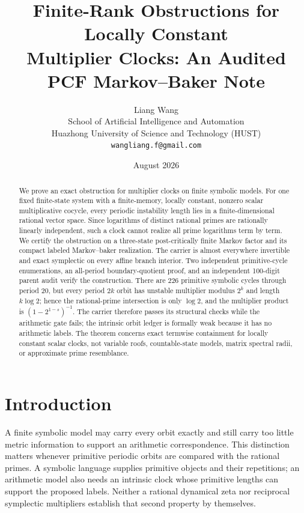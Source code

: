 \documentclass[11pt]{article}
\title{\textbf{Finite-Rank Obstructions for Locally Constant\\
Multiplier Clocks: An Audited PCF Markov--Baker Note}}
\author{
 Liang Wang\\
 School of Artificial Intelligence and Automation\\
 Huazhong University of Science and Technology (HUST)\\
 \texttt{wangliang.f@gmail.com}
}
\date{August 2026}
\theoremstyle{definition}
\theoremstyle{remark}
\begin{document}
\maketitle

\begin{abstract}
We prove an exact obstruction for multiplier clocks on finite symbolic
models.  For one fixed finite-state system with a finite-memory, locally
constant, nonzero scalar multiplicative cocycle, every periodic instability
length lies in a finite-dimensional rational vector space.  Since logarithms
of distinct rational primes are rationally linearly independent, such a clock
cannot realize all prime logarithms term by term.  We certify the obstruction
on a three-state post-critically finite Markov factor and its compact labeled
Markov--baker realization.  The carrier is almost everywhere invertible and
exact symplectic on every affine branch interior.  Two independent
primitive-cycle enumerations, an all-period boundary-quotient proof, and an
independent 100-digit parent audit verify the construction.  There are 226
primitive symbolic cycles through period 20, but every period \(2k\)
orbit has unstable multiplier modulus \(2^k\) and length
\(k\log2\); hence the rational-prime intersection is only \(\log2\), and the
multiplier product is \((1-2^{1-s})^{-1}\).  The carrier therefore passes its
structural checks while the arithmetic gate fails; the intrinsic orbit ledger
is formally weak because it has no arithmetic labels.  The theorem concerns
exact termwise containment for locally constant scalar clocks, not variable
roofs, countable-state models, matrix spectral radii, or approximate prime
resemblance.
\end{abstract}

\section{Introduction}
\label{sec:intro}

A finite symbolic model may carry every orbit exactly and still carry too
little metric information to support an arithmetic correspondence.  This
distinction matters whenever primitive periodic orbits are compared with the
rational primes.  A symbolic language supplies primitive objects and their
repetitions; an arithmetic model also needs an intrinsic clock whose primitive
lengths can support the proposed labels.  Neither a rational dynamical zeta
nor reciprocal symplectic multipliers establish that second property by
themselves.
\end{document}
